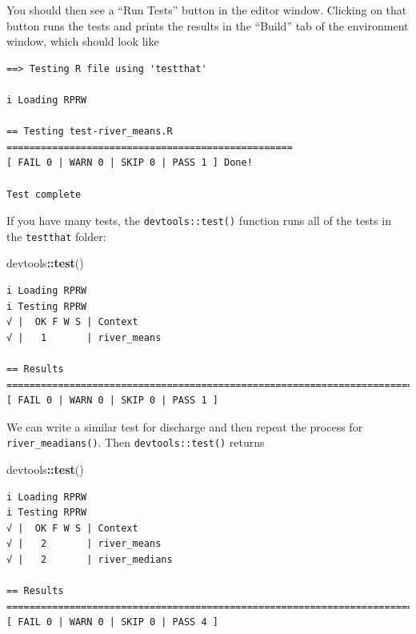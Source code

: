 \documentclass[
]{book}
\newenvironment{Shaded}{\begin{snugshade}}{\end{snugshade}}
\newcommand{\KeywordTok}[1]{\textcolor[rgb]{0.13,0.29,0.53}{\textbf{#1}}}
\newcommand{\NormalTok}[1]{#1}
\newcommand{\OperatorTok}[1]{\textcolor[rgb]{0.81,0.36,0.00}{\textbf{#1}}}
\begin{document}
You should then see a ``Run Tests'' button in the editor window. Clicking on that button runs the tests and prints the results in the ``Build'' tab of the environment window, which should look like

\begin{verbatim}
==> Testing R file using 'testthat'

i Loading RPRW

== Testing test-river_means.R ==================================================
[ FAIL 0 | WARN 0 | SKIP 0 | PASS 1 ] Done!

Test complete
\end{verbatim}

If you have many tests, the \texttt{devtools::test()} function runs all of the tests in the \texttt{testthat} folder:

\begin{Shaded}
\begin{Highlighting}[]
\NormalTok{devtools}\OperatorTok{::}\KeywordTok{test}\NormalTok{()}
\end{Highlighting}
\end{Shaded}

\begin{verbatim}
i Loading RPRW
i Testing RPRW
√ |  OK F W S | Context
√ |   1       | river_means                                                     
                                               
== Results =========================================================================
[ FAIL 0 | WARN 0 | SKIP 0 | PASS 1 ]
\end{verbatim}

We can write a similar test for discharge and then repeat the process for \texttt{river\_meadians()}. Then \texttt{devtools::test()} returns

\begin{Shaded}
\begin{Highlighting}[]
\NormalTok{devtools}\OperatorTok{::}\KeywordTok{test}\NormalTok{()}
\end{Highlighting}
\end{Shaded}

\begin{verbatim}
i Loading RPRW
i Testing RPRW
√ |  OK F W S | Context
√ |   2       | river_means                                                         
√ |   2       | river_medians                                                       

== Results =========================================================================
[ FAIL 0 | WARN 0 | SKIP 0 | PASS 4 ]
\end{verbatim}
\end{document}

